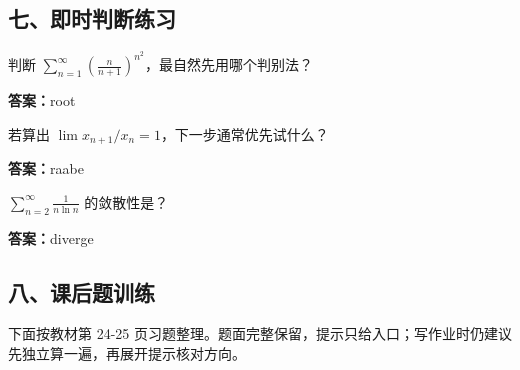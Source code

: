 \subsection*{七、即时判断练习}

\begin{quickcheck}
判断 \(\sum_{n=1}^{\infty}\left(\frac{n}{n+1}\right)^{n^2}\)，最自然先用哪个判别法？

\tcblower
\textbf{答案：}root
\end{quickcheck}

\begin{quickcheck}
若算出 \(\lim x_{n+1}/x_n=1\)，下一步通常优先试什么？

\tcblower
\textbf{答案：}raabe
\end{quickcheck}

\begin{quickcheck}
\(\sum_{n=2}^{\infty}\frac1{n\ln n}\) 的敛散性是？

\tcblower
\textbf{答案：}diverge
\end{quickcheck}

\subsection*{八、课后题训练}

下面按教材第 24-25 页习题整理。题面完整保留，提示只给入口；写作业时仍建议先独立算一遍，再展开提示核对方向。

